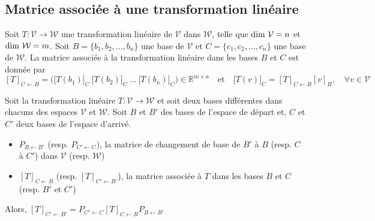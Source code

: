 	\subsection{Matrice associée à une transformation linéaire}
		\begin{mydef}
			Soit $T : \mathcal{V}\longrightarrow\mathcal{W}$ une transformation linéaire de $\mathcal{V}$ dans $\mathcal{W}$, telle que $\text{\normalfont{dim}}\ \mathcal{V}=n$ et $\text{\normalfont{dim}}\ \mathcal{W}=m$. Soit $B=\{b_1,b_2,...,b_n\}$ une base de $\mathcal{V}$ et $C=\{c_1,c_2,...,c_n\}$ une base de $\mathcal{W}$. La matrice associée à la transformation linéaire dans les bases $B$ et $C$ est donnée par
			\[[T]_{C\leftarrow B}=\Big(\big[T(b_1)\big]_C\: \big[T(b_2)\big]_C\: ...\: \big[T(b_n)\big]_C\Big)\in\mathbb{R}^{m\times n}\quad\text{et}\quad\big[T(v)\big]_C = [T]_{C\leftarrow B}[v]_B,\quad\forall v\in\mathcal{V}\]
		\end{mydef}
		\begin{myprop}
			Soit la transformation linéaire $T : \mathcal{V}\longrightarrow\mathcal{W}$ et soit deux bases différentes dans chacuns des espaces $\mathcal{V}$ et $\mathcal{W}$. Soit $B$ et $B'$ des bases de l'espace de départ et, $C$ et $C'$ deux bases de l'espace d'arrivé.
			\begin{itemize}
				\item $P_{B\leftarrow B'}$ (resp. $P_{C'\leftarrow C}$), la matrice de changement de base de $B'$ à $B$ (resp. $C$ à $C'$) dans $\mathcal{V}$ (resp. $\mathcal{W}$)
				\item $[T]_{C\leftarrow B}$ (resp. $[T]_{C'\leftarrow B'}$), la matrice associée à $T$ dans les bases $B$ et $C$ (resp. $B'$ et $C'$) 
			\end{itemize}
		Alors, $[T]_{C'\leftarrow B'}=P_{C'\leftarrow C}[T]_{C\leftarrow B}P_{B\leftarrow B'}$ 
		\end{myprop}
